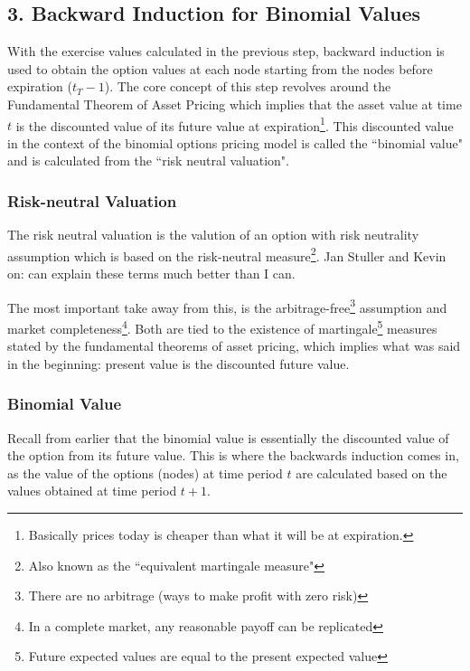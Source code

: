 \documentclass[12pt, letterpaper]{article}\usepackage{float}
\begin{document}
\pagebreak
\subsection*{3. Backward Induction for Binomial Values}
With the exercise values calculated in the previous step, backward induction is used to obtain the option values at each node starting from the nodes before expiration (${t_T - 1}$).
The core concept of this step revolves around the Fundamental Theorem of Asset Pricing which implies that the asset value at time ${t}$ is the discounted value of its future value at expiration\footnote{Basically prices today is cheaper than what it will be at expiration.}\cite{blythevideo}\cite{ftapwikipedia}.
This discounted value in the context of the binomial options pricing model is called the ``binomial value" and is calculated from the ``risk neutral valuation".

\subsubsection*{Risk-neutral Valuation}
The risk neutral valuation is the valution of an option with risk neutrality assumption\cite{riskneutralvalutionwikipedia} which is based on the risk-neutral measure\footnote{Also known as the ``equivalent martingale measure"}\cite{riskneutralmeasurewikipedia}.
Jan Stuller and Kevin on: \href{https://quant.stackexchange.com/questions/55239/what-is-the-risk-neutral-measure}{\color{blue}{quant.stackexchange}} can explain these terms much better than I can.

\medskip

The most important take away from this, is the arbitrage-free\footnote{There are no arbitrage (ways to make profit with zero risk)} assumption and market completeness\footnote{In a complete market, any reasonable payoff can be replicated\cite{riskneutralmeasurestackexchange}}.
Both are tied to the existence of martingale\footnote{Future expected values are equal to the present expected value} measures stated by the fundamental theorems of asset pricing\cite{ftapwikipedia}, which implies what was said in the beginning: present value is the discounted future value.


\subsubsection*{Binomial Value}
Recall from earlier that the binomial value is essentially the discounted value of the option from its future value.
This is where the backwards induction comes in, as the value of the options (nodes) at time period ${t}$ are calculated based on the values obtained at time period ${t+1}$.
\end{document}
